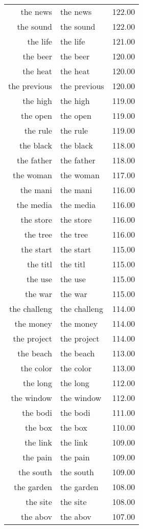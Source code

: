 \begin{table}[ht]
\begin{tabular}{rlr}
  the news & the news & 122.00 \\ 
  the sound & the sound & 122.00 \\ 
  the life & the life & 121.00 \\ 
  the beer & the beer & 120.00 \\ 
  the heat & the heat & 120.00 \\ 
  the previous & the previous & 120.00 \\ 
  the high & the high & 119.00 \\ 
  the open & the open & 119.00 \\ 
  the rule & the rule & 119.00 \\ 
  the black & the black & 118.00 \\ 
  the father & the father & 118.00 \\ 
  the woman & the woman & 117.00 \\ 
  the mani & the mani & 116.00 \\ 
  the media & the media & 116.00 \\ 
  the store & the store & 116.00 \\ 
  the tree & the tree & 116.00 \\ 
  the start & the start & 115.00 \\ 
  the titl & the titl & 115.00 \\ 
  the use & the use & 115.00 \\ 
  the war & the war & 115.00 \\ 
  the challeng & the challeng & 114.00 \\ 
  the money & the money & 114.00 \\ 
  the project & the project & 114.00 \\ 
  the beach & the beach & 113.00 \\ 
  the color & the color & 113.00 \\ 
  the long & the long & 112.00 \\ 
  the window & the window & 112.00 \\ 
  the bodi & the bodi & 111.00 \\ 
  the box & the box & 110.00 \\ 
  the link & the link & 109.00 \\ 
  the pain & the pain & 109.00 \\ 
  the south & the south & 109.00 \\ 
  the garden & the garden & 108.00 \\ 
  the site & the site & 108.00 \\ 
  the abov & the abov & 107.00 \\ 

\end{tabular}
\end{table}
